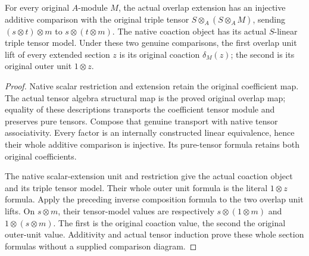 \begin{lemma}
\label{lem:kn-nadel-faithfully-flat-tensor-comparison}

For every original $A$-module $M$, the actual overlap extension has
an injective additive comparison with the original triple tensor
$S\otimes_A(S\otimes_A M)$, sending
$(s\otimes t)\otimes m$ to $s\otimes(t\otimes m)$.
The native coaction object has its actual $S$-linear triple tensor
model.  Under these two genuine comparisons, the first overlap
unit lift of every extended section $z$ is its original coaction
$\delta_M(z)$; the second is its original outer unit $1\otimes z$.
\end{lemma}
\begin{proof}
Native scalar restriction and extension retain the original
coefficient map.  The actual tensor algebra structural map is the
proved original overlap map; equality of these descriptions
transports the coefficient tensor module and preserves pure
tensors.  Compose that genuine transport with native tensor
associativity.  Every factor is an internally constructed linear
equivalence, hence their whole additive comparison is injective.
Its pure-tensor formula retains both original coefficients.

The native scalar-extension unit and restriction give the actual
coaction object and its triple tensor model.  Their whole outer
unit formula is the literal $1\otimes z$ formula.  Apply the
preceding inverse composition formula to the two overlap unit
lifts.  On $s\otimes m$, their tensor-model values are respectively
$s\otimes(1\otimes m)$ and $1\otimes(s\otimes m)$.  The first is
the original coaction value, the second the original outer-unit
value.  Additivity and actual tensor induction prove these whole
section formulas without a supplied comparison diagram.
\end{proof}

